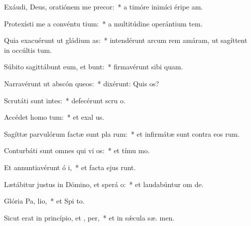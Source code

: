 \item Exáudi, Deus, oratiónem me  precor:~* a timóre inimíci éripe  am.
\item Protexísti me a convéntu tium:~* a multitúdine operántium tem.
\item Quia exacuérunt ut gládium  as:~* intendérunt arcum rem amáram, ut sagíttent in occúltis tum.
\item Súbito sagittábunt eum, et  bunt:~* firmavérunt sibi  quam.
\item Narravérunt ut abscón queos:~* dixérunt: Quis  os?
\item Scrutáti sunt intes:~* defecérunt scru o.
\item Accédet homo   tum:~* et exal us.
\item Sagíttæ parvulórum factæ sunt pla rum:~* et infirmátæ sunt contra eos  rum.
\item Conturbáti sunt omnes qui vi os:~* et tímu  mo.
\item Et annuntiavérunt ó i,~* et facta ejus runt.
\item Lætábitur justus in Dómino, et sperá  o:~* et laudabúntur om  de.
\item Glória Pa,  lio,~* et Spi to.
\item Sicut erat in princípio, et ,  per,~* et in sǽcula sæ. men.
